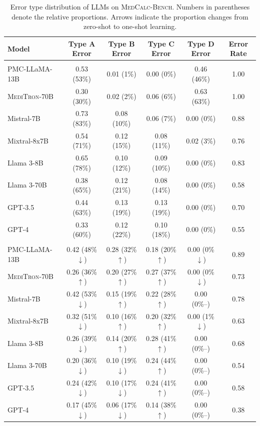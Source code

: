 \begin{table}[h!] \small
    \centering
    \caption{Error type distribution of LLMs on \textsc{MedCalc-Bench}. Numbers in parentheses denote the relative proportions. Arrows indicate the proportion changes from zero-shot to one-shot learning.}
    \begin{tabular}{lccccc}
        \toprule
        \bf Model & \textbf{Type A Error} & \textbf{Type B Error} & \textbf{Type C Error} & \textbf{Type D Error} & \bf \textbf{Error Rate} \\
        \midrule
        \rowcolor[RGB]{234, 238, 234}
        \multicolumn{6}{l}{\it Zero-shot CoT Prompting} \\
PMC-LLaMA-13B & 0.53 (53\%) & 0.01 (1\%) & 0.00 (0\%) & 0.46 (46\%) & 1.00 \\
\textsc{MediTron}-70B & 0.30 (30\%) & 0.02 (2\%) & 0.06 (6\%) & 0.63 (63\%) & 1.00 \\
Mistral-7B & 0.73 (83\%) & 0.08 (10\%) & 0.06 (7\%) & 0.00 (0\%) & 0.88 \\
Mixtral-8x7B & 0.54 (71\%) & 0.12 (15\%) & 0.08 (11\%) & 0.02 (3\%) & 0.76 \\
Llama 3-8B & 0.65 (78\%) & 0.10 (12\%) & 0.09 (10\%) & 0.00 (0\%) & 0.83 \\
Llama 3-70B & 0.38 (65\%) & 0.12 (21\%) & 0.08 (14\%) & 0.00 (0\%) & 0.58 \\
GPT-3.5 & 0.44 (63\%) & 0.13 (19\%) & 0.13 (19\%) & 0.00 (0\%) & 0.70 \\
GPT-4 & 0.33 (60\%) & 0.12 (22\%) & 0.10 (18\%) & 0.00 (0\%) & 0.55 \\
        \midrule
        \rowcolor[RGB]{234, 238, 234}
        \multicolumn{6}{l}{\it One-shot CoT Prompting} \\
PMC-LLaMA-13B & 0.42 (48\%\(\downarrow\)) & 0.28 (32\%\(\uparrow\)) & 0.18 (20\%\(\uparrow\)) & 0.00 (0\%\(\downarrow\)) & 0.89 \\
\textsc{MediTron}-70B & 0.26 (36\%\(\uparrow\)) & 0.20 (27\%\(\uparrow\)) & 0.27 (37\%\(\uparrow\)) & 0.00 (0\%\(\downarrow\)) & 0.73 \\
Mistral-7B & 0.42 (53\%\(\downarrow\)) & 0.15 (19\%\(\uparrow\)) & 0.22 (28\%\(\uparrow\)) & 0.00 (0\%--) & 0.78 \\
Mixtral-8x7B & 0.32 (51\%\(\downarrow\)) & 0.10 (16\%\(\uparrow\)) & 0.20 (32\%\(\uparrow\)) & 0.00 (1\%\(\downarrow\)) & 0.63 \\
Llama 3-8B & 0.26 (39\%\(\downarrow\)) & 0.14 (20\%\(\uparrow\)) & 0.28 (41\%\(\uparrow\)) & 0.00 (0\%--) & 0.68 \\
Llama 3-70B & 0.20 (36\%\(\downarrow\)) & 0.10 (19\%\(\downarrow\)) & 0.24 (44\%\(\uparrow\)) & 0.00 (0\%--) & 0.54 \\
GPT-3.5 & 0.24 (42\%\(\downarrow\)) & 0.10 (17\%\(\downarrow\)) & 0.24 (41\%\(\uparrow\)) & 0.00 (0\%--) & 0.58 \\
GPT-4 & 0.17 (45\%\(\downarrow\)) & 0.06 (17\%\(\downarrow\)) & 0.14 (38\%\(\uparrow\)) & 0.00 (0\%--) & 0.38 \\
        \bottomrule
    \end{tabular}
    \label{tab:error_analysis_results}
\end{table}
